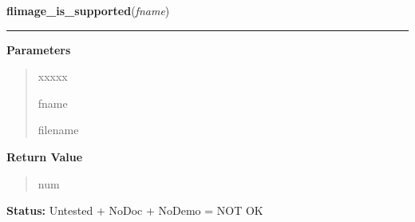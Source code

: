 \hspace{.8\funcindent}\begin{boxedminipage}{\funcwidth}

    \raggedright \textbf{flimage\_is\_supported}(\textit{fname})

    \vspace{-1.5ex}

    \rule{\textwidth}{0.5\fboxrule}
\setlength{\parskip}{2ex}
\setlength{\parskip}{1ex}
      \textbf{Parameters}
      \vspace{-1ex}

      \begin{quote}
        \begin{Ventry}{xxxxx}

          \item[fname]

          filename

        \end{Ventry}

      \end{quote}

      \textbf{Return Value}
    \vspace{-1ex}

      \begin{quote}
      num

      \end{quote}

\textbf{Status:} Untested + NoDoc + NoDemo = NOT OK



    \end{boxedminipage}

    \label{xformslib:flflimage:flimage_description_via_filter}

    \vspace{0.5ex}

